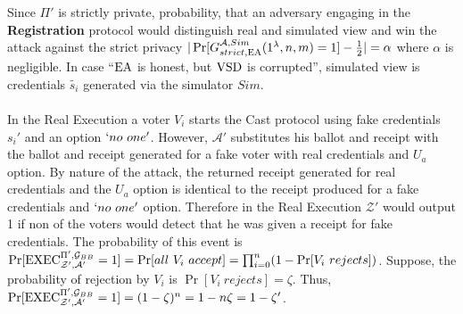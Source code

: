 \\\\
Since $\Pi'$ is strictly private, probability, that an adversary engaging in the \textbf{Registration} protocol would distinguish real and simulated view and win the attack against the strict privacy $|\Pr[G_{strict,\operatorname{EA}}^{\mathcal{A},Sim}(1^{\lambda},n,m) = 1] - \frac{1}{2}| = \alpha$ where $\alpha$ is negligible. In case ``$\operatorname{EA}$ is honest, but $\operatorname{VSD}$ is corrupted'', simulated view is credentials $\tilde{s_i}$ generated via the simulator $Sim$. \\\\
In the Real Execution a voter $V_i$ starts the Cast protocol using fake credentials $s_i'$ and an option $`no~one'$. However, $\mathcal{A'}$ substitutes his ballot and receipt with the ballot and receipt generated for a fake voter with real credentials and $U_a$ option. By nature of the attack, the returned receipt generated for real credentials and the $U_a$ option is identical to the receipt produced for a fake credentials and $`no~one'$ option. Therefore in the Real Execution $\mathcal{Z'}$ would output 1 if non of the voters would detect that he was given a receipt for fake credentials. The probability of this event is $\Pr[\operatorname{EXEC}_{\mathcal{Z'},\mathcal{A'}}^{\Pi', \mathcal{G}_{BB}} = 1] =  \Pr[all~V_i~accept] = \prod_{i=0}^n(1- \Pr[V_i~rejects] )$. Suppose, the probability of rejection by $V_i$ is $ \Pr[V_i~rejects] = \zeta$. Thus,   $\Pr[\operatorname{EXEC}_{\mathcal{Z'},\mathcal{A'}}^{\Pi', \mathcal{G}_{BB}} = 1] = (1 - \zeta)^n = 1 - n\zeta = 1- \zeta'$.\\\\
